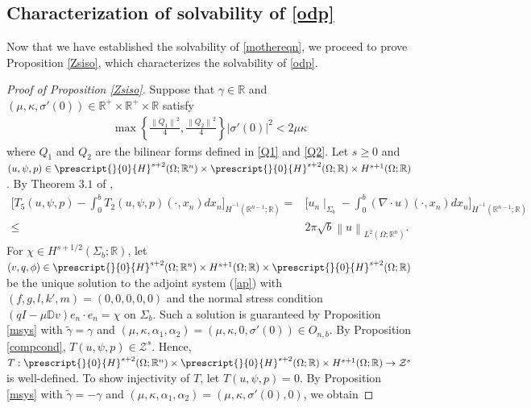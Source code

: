 \documentclass[11pt,letterpaper,reqno]{amsart}
\numberwithin{equation}{section}
\newcommand{\abs}[1]{\left\lvert#1\right\rvert}
\newcommand{\norm}[1]{\left\lVert#1\right\rVert}
\begin{document}
\subsection{Characterization of solvability of \eqref{odp}}
Now that we have established the solvability of \eqref{mothereqn}, we proceed to prove Proposition \ref{Zsiso}, which characterizes the solvability of \eqref{odp}.

\begin{proof}[Proof of Proposition \ref{Zsiso}]
    Suppose that \(\gamma\in \mathbb{R}\) and \((\mu,\kappa,\sigma'(0)) \in \mathbb{R}^{+} \times \mathbb{R}^{+} \times \mathbb{R}\) satisfy
    \begin{align}
        \max\left\{\frac{\norm{Q_{1}}^{2}}{4},\frac{\norm{Q_{2}}^{2}}{4}\right\}\abs{\sigma'(0)}^{2} < 2\mu\kappa
    \end{align}
    where \(Q_{1}\) and \(Q_{2}\) are the bilinear forms defined in \eqref{Q1} and \eqref{Q2}. Let \(s \geq 0\) and \((u,\psi,p) \in \prescript{}{0}{H}^{s+2}(\Omega;\mathbb{R}^{n}) \times \prescript{}{0}{H}^{s+2}(\Omega;\mathbb{R})\times H^{s+1}(\Omega;\mathbb{R})\). By Theorem \(3.1\) of \cite{leoni2023traveling},
    \begin{align}
        \biggl[T_{5}(u,\psi,p)-\int_{0}^{b}T_{2}(u,\psi,p)(\cdot,x_{n})d x_{n}\biggr]_{\dot{H}^{-1}(\mathbb{R}^{n-1};\mathbb{R})} =& \biggl[u_{n} \mid_{\Sigma_{b}}-\int_{0}^{b}(\nabla \cdot u)(\cdot,x_{n})d x_{n}\biggr]_{\dot{H}^{-1}(\mathbb{R}^{n-1};\mathbb{R})} \nonumber\\
        \leq&2\pi\sqrt{b}\norm{u}_{L^{2}(\Omega;\mathbb{R}^{n})}.
    \end{align}
    For \(\chi \in H^{s+1/2}(\Sigma_{b};\mathbb{R})\), let \((v,q,\phi) \in \prescript{}{0}{H}^{s+2}(\Omega;\mathbb{R}^{n}) \times H^{s+1}(\Omega;\mathbb{R}) \times \prescript{}{0}{H}^{s+2}(\Omega;\mathbb{R})\) be the unique solution to the adjoint system (\ref{ap}) with \((f,g,l,k',m)=(0,0,0,0,0)\) and the normal stress condition \((qI-\mu\mathbb{D}v)e_{n} \cdot e_{n}=\chi\) on \(\Sigma_{b}\). Such a solution is guaranteed by Proposition \ref{msys} with \(\widetilde{\gamma}=\gamma\) and \((\mu,\kappa,\alpha_{1},\alpha_{2})=(\mu,\kappa,0,\sigma'(0)) \in O_{n,b}\). By Proposition \ref{compcond}, \(T(u,\psi,p) \in \mathcal{Z}^{s}\). Hence, \(T: \prescript{}{0}{H}^{s+2}(\Omega;\mathbb{R}^{n}) \times \prescript{}{0}{H}^{s+2}(\Omega;\mathbb{R})\times H^{s+1}(\Omega;\mathbb{R}) \to \mathcal{Z}^{s}\) is well-defined. To show injectivity of \(T\), let \(T(u,\psi,p) =0\). By Proposition \ref{msys} with \(\widetilde{\gamma}=-\gamma\) and \((\mu,\kappa,\alpha_{1},\alpha_{2})=(\mu,\kappa,\sigma'(0),0)\), we obtain

\end{proof}
\end{document}
